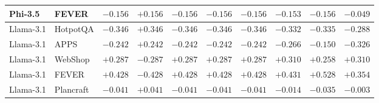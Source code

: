 \begin{table}[t]
{\begin{tabular}{l l c c c c c c c c}
Phi-3.5 & FEVER    & $-0.156$ & $+0.156$ & $-0.156$ & $-0.156$ & $-0.156$ & $-0.153$ & $-0.156$ & $-0.049$ \\
\midrule
Llama-3.1 & HotpotQA  & $-0.346$ & $+0.346$ & $-0.346$ & $-0.346$ & $-0.346$ & $-0.332$ & $-0.335$ & $-0.288$ \\
Llama-3.1 & APPS      & $-0.242$ & $+0.242$ & $-0.242$ & $-0.242$ & $-0.242$ & $-0.266$ & $-0.150$ & $-0.326$ \\
Llama-3.1 & WebShop   & $+0.287$ & $-0.287$ & $+0.287$ & $+0.287$ & $+0.287$ & $+0.310$ & $+0.258$ & $+0.310$ \\
Llama-3.1 & FEVER     & $+0.428$ & $-0.428$ & $+0.428$ & $+0.428$ & $+0.428$ & $+0.431$ & $+0.528$ & $+0.354$ \\
Llama-3.1 & Plancraft & $-0.041$ & $+0.041$ & $-0.041$ & $-0.041$ & $-0.041$ & $-0.014$ & $-0.035$ & $-0.003$ \\
\bottomrule
\end{tabular}%
}
\end{table}